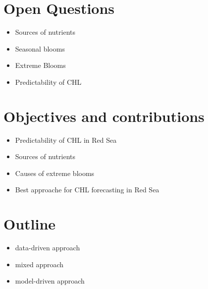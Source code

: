 \section{Open Questions}
\label{intro:questions}

	\begin{itemize}
		\item Sources of nutrients
		\item Seasonal blooms
		\item Extreme Blooms
		\item Predictability of CHL
	\end{itemize}

\section{Objectives and contributions}
\label{intro:objectives}

	\begin{itemize}
		\item Predictability of CHL in Red Sea
		\item Sources of nutrients
		\item Causes of extreme blooms
		\item Best approache for CHL forecasting in Red Sea
	\end{itemize}

\section{Outline}
\label{intro:outline}

	\begin{itemize}
		\item data-driven approach
		\item mixed approach
		\item model-driven approach
	\end{itemize}
